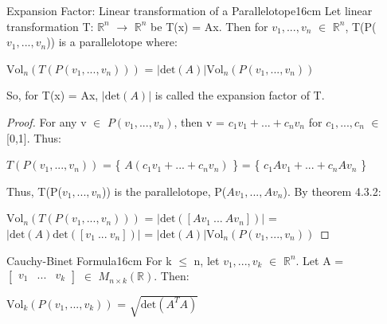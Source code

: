     \vspace{0.5cm}



    \begin{corollary}{Expansion Factor:
    Linear transformation of a Parallelotope}{16cm}
        Let linear transformation T: $\mathbb{R}^n$ $\rightarrow$ $\mathbb{R}^n$
        be T(x) = Ax. Then for $v_1,...,v_n$ $\in$ $\mathbb{R}^n$,
        T(P($v_1,...,v_n$)) is a parallelotope where:

        \hspace{0.5cm}
        $\text{Vol}_n(T(P(v_1,...,v_n)))$
        = $|\text{det}(A)| \text{Vol}_n(P(v_1,...,v_n))$

        So, for T(x) = Ax, $|\text{det}(A)|$ is called the
        {\color{lblue} expansion factor} of T.
    \end{corollary}

    \begin{proof}
        For any v $\in$ $P(v_1,...,v_n)$, then
        v = $c_1v_1 + ... + c_nv_n$ for $c_1,...,c_n$ $\in$ [0,1].
        Thus:

        \hspace{0.5cm}
        $T(P(v_1,...,v_n))$
        = \{ $A(c_1v_1 + ... + c_nv_n)$ \}
        = \{ $c_1Av_1 + ... + c_nAv_n$ \}

        Thus, T(P($v_1,...,v_n$)) is the parallelotope,
        P($Av_1,...,Av_n$).
        By {\color{red} theorem 4.3.2}:

        \hspace{0.3cm}
        \small
        $\text{Vol}_n(T(P(v_1,...,v_n)))$
        = $|\text{det}([Av_1 \ ... \ Av_n])|$
        = $|\text{det}(A)\text{det}([v_1 \ ... \ v_n])|$
        = $|\text{det}(A)| \text{Vol}_n(P(v_1,...,v_n))$
    \end{proof}

    \newpage



    \begin{wtheorem}{Cauchy-Binet Formula}{16cm}
        For k $\leq$ n, let $v_1,...,v_k$ $\in$ $\mathbb{R}^n$.
        Let A =
        $\begin{bmatrix}
            v_1 & ... & v_k
        \end{bmatrix}$
        $\in$ $M_{n \times k}(\mathbb{R})$. Then:

        \hspace{0.5cm}
        $\text{Vol}_k(P(v_1,...,v_k))$
        = $\sqrt{\text{det}(A^TA)}$
    \end{wtheorem}

